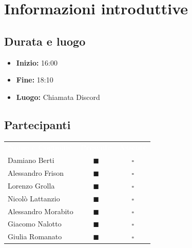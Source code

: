 \documentclass[a4paper, 11pt]{article}
\begin{document}

\section{Informazioni introduttive}

\subsection{Durata e luogo}
\begin{itemize}
    \item \textbf{Inizio:} 16:00
    \item \textbf{Fine:} 18:10
    \item \textbf{Luogo:} Chiamata Discord
\end{itemize}

\subsection{Partecipanti}
\begin{center}
    \begin{tabular}{>{\raggedright\arraybackslash}p{6cm} c c}
        \rowcolor{AccentColor}
        \textcolor{white}{\textbf{Nome e Cognome}} & 
        \textcolor{white}{\textbf{Presente}} & 
        \textcolor{white}{\textbf{Assente}} \\
        
        Damiano Berti     & \textcolor{AccentColor}{$\blacksquare$}    & $\square$        \\
        Alessandro Frison     & \textcolor{AccentColor}{$\blacksquare$}    & $\square$        \\
        Lorenzo Grolla     & \textcolor{AccentColor}{$\blacksquare$}    & $\square$        \\
        Nicolò Lattanzio    & \textcolor{AccentColor}{$\blacksquare$}    & $\square$        \\
        Alessandro Morabito   & \textcolor{AccentColor}{$\blacksquare$}    & $\square$        \\
        Giacomo Nalotto   & \textcolor{AccentColor}{$\blacksquare$}    & $\square$        \\
        Giulia Romanato   & \textcolor{AccentColor}{$\blacksquare$}    & $\square$        \\
    \end{tabular}
\end{center}
\end{document}
